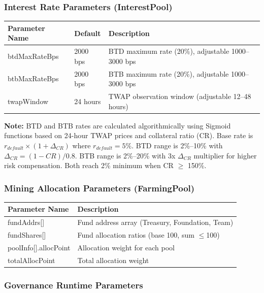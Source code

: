 \documentclass{article}
\begin{document}
\subsubsection{Interest Rate Parameters (InterestPool)}

\begin{center}
\begin{longtable}{p{4.5cm}p{3cm}p{6.5cm}}
\toprule
Parameter Name & Default & Description \\
\midrule
\endhead
btdMaxRateBps & 2000 bps & BTD maximum rate (20\%), adjustable 1000--3000 bps \\
btbMaxRateBps & 2000 bps & BTB maximum rate (20\%), adjustable 1000--3000 bps \\
twapWindow & 24 hours & TWAP observation window (adjustable 12--48 hours) \\
\bottomrule
\end{longtable}
\end{center}

\textbf{Note:} BTD and BTB rates are calculated algorithmically using Sigmoid functions based on 24-hour TWAP prices and collateral ratio (CR). Base rate is $r_{default} \times (1 + \Delta_{CR})$ where $r_{default} = 5\%$. BTD range is 2\%--10\% with $\Delta_{CR} = (1-CR)/0.8$. BTB range is 2\%--20\% with 3x $\Delta_{CR}$ multiplier for higher risk compensation. Both reach 2\% minimum when CR $\geq$ 150\%.

\subsubsection{Mining Allocation Parameters (FarmingPool)}

\begin{center}
\begin{longtable}{p{4cm}p{10cm}}
\toprule
Parameter Name & Description \\
\midrule
\endhead
fundAddrs[] & Fund address array (Treasury, Foundation, Team) \\
fundShares[] & Fund allocation ratios (base 100, sum $\leq$100) \\
poolInfo[].allocPoint & Allocation weight for each pool \\
totalAllocPoint & Total allocation weight \\
\bottomrule
\end{longtable}
\end{center}

\subsubsection{Governance Runtime Parameters}
\end{document}
